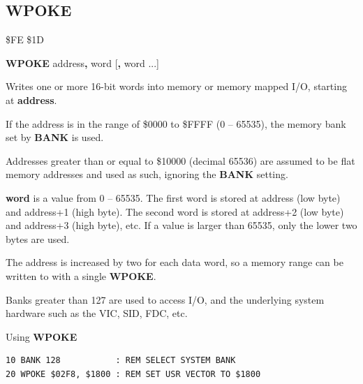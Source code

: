 \subsection{WPOKE}
\begin{description}[leftmargin=2cm,style=nextline]
\item [Token:]    \$FE \$1D

\item [Format:]   {\bf WPOKE} address{\bf,} word [{\bf,} word ...]

\item [Returns:]  Writes one or more 16-bit words into memory or memory mapped I/O, starting at {\bf address}.

                  If the address is in the range of \$0000 to \$FFFF (0 -- 65535), the memory bank set by {\bf BANK} is used.

                  Addresses greater than or equal to \$10000 (decimal 65536) are assumed to be flat memory addresses and used as such, ignoring the {\bf BANK} setting.

                  {\bf word} is a value from 0 -- 65535. The first word is stored at address (low byte) and address+1 (high byte). The second word is stored at address+2 (low byte) and address+3 (high byte), etc. If a value is larger than 65535, only the lower two bytes are used.

\item [Remarks:]  The address is increased by two for each data word, so a memory range can be written to with a single {\bf WPOKE}.

                  Banks greater than 127 are used to access I/O, and the underlying system hardware such as the VIC, SID, FDC, etc.

\item [Example:]  Using {\bf WPOKE}

\begin{tcolorbox}[colback=black,coltext=white]
\verbatimfont{\codefont}
\begin{verbatim}
10 BANK 128           : REM SELECT SYSTEM BANK
20 WPOKE $02F8, $1800 : REM SET USR VECTOR TO $1800
\end{verbatim}
\end{tcolorbox}
\end{description}


\newpage
